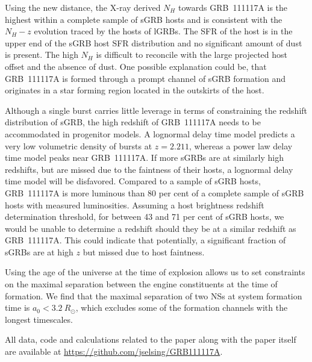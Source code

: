 \documentclass{aa}    %
\begin{document}
Using the new distance, the X-ray derived $N_H$ towards GRB~111117A is the
highest within a complete sample of sGRB hosts and is consistent with the
$N_H-z$ evolution traced by the hosts of lGRBs. The SFR of the host is in the
upper end of the sGRB host SFR distribution and no significant amount of dust is
present. The high $N_H$ is difficult to reconcile with the large projected host
offset and the absence of dust. One possible explanation could be, that
GRB~111117A is formed through a prompt channel of sGRB formation and originates
in a star forming region located in the outskirts of the host.

Although a single burst carries little leverage in terms of constraining the
redshift distribution of sGRB, the high redshift of GRB~111117A needs to be
accommodated in progenitor models. A lognormal delay time model predicts a very
low volumetric density of bursts at $z = 2.211$, whereas a power law delay time
model peaks near GRB~111117A. If more sGRBs are at similarly high redshifts, but
are missed due to the faintness of their hosts, a lognormal delay time model
will be disfavored. Compared to a sample of sGRB hosts, GRB~111117A is more
luminous than 80 per cent of a complete sample of sGRB hosts with measured
luminosities. Assuming a host brightness redshift determination threshold, for
between 43 and 71 per cent of sGRB hosts, we would be unable to determine a
redshift should they be at a similar redshift as GRB~111117A. This could
indicate that potentially, a significant fraction of sGRBs are at high $z$ but
missed due to host faintness.

Using the age of the universe at the time of explosion allows us to set
constraints on the maximal separation between the engine constituents at the
time of formation. We find that the maximal separation of two NSs at system
formation time is $a_0 < 3.2~R_\odot$, which excludes some of the formation
channels with the longest timescales.

All data, code and calculations related to the paper along with the
paper itself are available at \url{https://github.com/jselsing/GRB111117A}.
\end{document}
